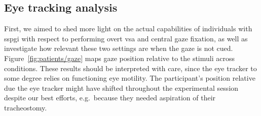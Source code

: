 \subsection{Eye tracking analysis}
\label{sec:patients/outcomes/gaze}

First, we aimed to shed more light on the actual capabilities of individuals
with \ac{sspgi} with respect to performing overt \ac{vsa} and central gaze
fixation, as well as investigate how relevant these two settings are when the
gaze is not cued.
Figure~\ref{fig:patients/gaze} maps gaze position relative to the stimuli
across conditions.
These results should be interpreted with care, since the eye tracker to some
degree relies on functioning eye motility.
The participant's position
relative due the eye tracker might have shifted throughout the experimental
session despite our best efforts, e.g.\ because they needed aspiration of their
tracheostomy.


